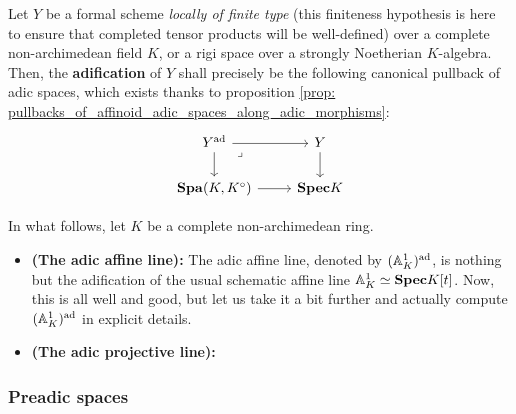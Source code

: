                     \begin{definition}[Adification] \label{def: adification}
                        Let $Y$ be a formal scheme \textit{locally of finite type} (this finiteness hypothesis is here to ensure that completed tensor products will be well-defined) over a complete non-archimedean field $K$, or a rigi space over a strongly Noetherian $K$-algebra. Then, the \textbf{adification} of $Y$ shall precisely be the following canonical pullback of adic spaces, which exists thanks to proposition \ref{prop: pullbacks_of_affinoid_adic_spaces_along_adic_morphisms}:
                            $$
                                \begin{tikzcd}
                                	{Y^{\ad}} & Y \\
                                	{\Spa(K, K^{\circ})} & {\Spec K}
                                	\arrow[from=2-1, to=2-2]
                                	\arrow[from=1-1, to=2-1]
                                	\arrow[from=1-1, to=1-2]
                                	\arrow["\lrcorner"{anchor=center, pos=0.125}, draw=none, from=1-1, to=2-2]
                                	\arrow[from=1-2, to=2-2]
                                \end{tikzcd}
                            $$
                    \end{definition}
                    \begin{example} \label{example: adification}
                        In what follows, let $K$ be a complete non-archimedean ring.
                        \begin{itemize}
                            \item \textbf{(The adic affine line):} The adic affine line, denoted by $(\mathbb{A}^1_K)^{\mathrm{ad}}$, is nothing but the adification of the usual schematic affine line $\mathbb{A}^1_K \simeq \mathbf{Spec} K[t]$. Now, this is all well and good, but let us take it a bit further and actually compute $(\mathbb{A}^1_K)^{\mathrm{ad}}$ in explicit details. 
                            \item \textbf{(The adic projective line):}
                        \end{itemize}
                    \end{example}
                
            \subsubsection{Preadic spaces}
